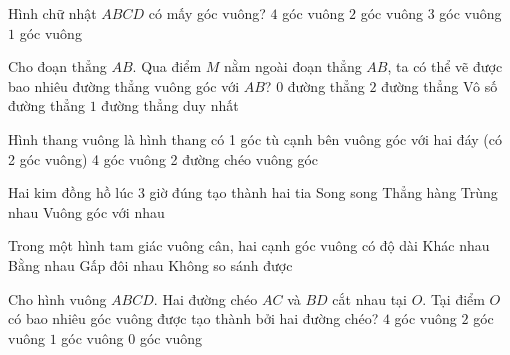\begin{ex} %
Hình chữ nhật $ABCD$ có mấy góc vuông?
\choice
{\True $4$ góc vuông}
{$2$ góc vuông}
{$3$ góc vuông}
{$1$ góc vuông}
\end{ex}

\begin{ex} %
Cho đoạn thẳng $AB$. Qua điểm $M$ nằm ngoài đoạn thẳng $AB$, ta có thể vẽ được bao nhiêu đường thẳng vuông góc với $AB$?
\choice
{$0$ đường thẳng}
{$2$ đường thẳng}
{Vô số đường thẳng}
{\True $1$ đường thẳng duy nhất}
\end{ex}

\begin{ex} %
Hình thang vuông là hình thang có
\choice
{1 góc tù}
{ cạnh bên vuông góc với hai đáy (có 2 góc vuông)}
{4 góc vuông}
{2 đường chéo vuông góc}
\end{ex}

\begin{ex} %
Hai kim đồng hồ lúc 3 giờ đúng tạo thành hai tia
\choice
{Song song}
{Thẳng hàng}
{Trùng nhau}
{\True Vuông góc với nhau}
\end{ex}

\begin{ex} %
Trong một hình tam giác vuông cân, hai cạnh góc vuông có độ dài
\choice
{Khác nhau}
{\True Bằng nhau}
{Gấp đôi nhau}
{Không so sánh được}
\end{ex}

\begin{ex} %
Cho hình vuông $ABCD$. Hai đường chéo $AC$ và $BD$ cắt nhau tại $O$. Tại điểm $O$ có bao nhiêu góc vuông được tạo thành bởi hai đường chéo?
\choice
{\True $4$ góc vuông}
{$2$ góc vuông}
{$1$ góc vuông}
{$0$ góc vuông}
\end{ex}

